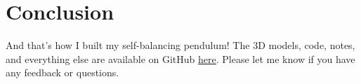 \documentclass{article}
\begin{document}
\section{Conclusion}

And that's how I built my self-balancing pendulum! The 3D models, code, notes, and everything else are available on GitHub \href{https://github.com/chrisdoble/self-balancing-inverted-pendulum}{here}. Please let me know if you have any feedback or questions.
\end{document}
